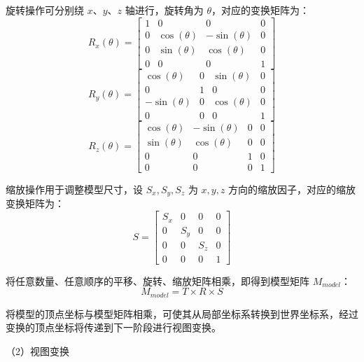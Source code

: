 旋转操作可分别绕 $x$、$y$、$z$ 轴进行，旋转角为 $\theta$，对应的变换矩阵为：
\begin{equation}
R_x(\theta) = 
\begin{bmatrix}
1 & 0 & 0 & 0 \\
0 & \cos(\theta) & -\sin(\theta) & 0 \\
0 & \sin(\theta) & \cos(\theta) & 0 \\
0 & 0 & 0 & 1 
\end{bmatrix}
\tag{2-2}
\end{equation}
\begin{equation}
R_y(\theta) = 
\begin{bmatrix}
\cos(\theta) & 0 & \sin(\theta) & 0 \\
0 & 1 & 0 & 0 \\
-\sin(\theta) & 0 & \cos(\theta) & 0 \\
0 & 0 & 0 & 1 
\end{bmatrix}
\tag{2-3}
\end{equation}
\begin{equation}
R_z(\theta) = 
\begin{bmatrix}
\cos(\theta) & -\sin(\theta) & 0 & 0 \\
\sin(\theta) & \cos(\theta) & 0 & 0 \\
0 & 0 & 1 & 0 \\
0 & 0 & 0 & 1 
\end{bmatrix}
\tag{2-4}
\end{equation}

缩放操作用于调整模型尺寸，设 $S_x, S_y, S_z$ 为 $x, y, z$ 方向的缩放因子，对应的缩放变换矩阵为：
\begin{equation}
S = 
\begin{bmatrix}
S_x & 0 & 0 & 0 \\
0 & S_y & 0 & 0 \\
0 & 0 & S_z & 0 \\
0 & 0 & 0 & 1 
\end{bmatrix}
\tag{2-5}
\end{equation}

将任意数量、任意顺序的平移、旋转、缩放矩阵相乘，即得到模型矩阵 $M_{model}$：
\begin{equation}
M_{model} = T \times R \times S
\tag{2-6}
\end{equation}

将模型的顶点坐标与模型矩阵相乘，可使其从局部坐标系转换到世界坐标系，经过变换的顶点坐标将传递到下一阶段进行视图变换。

（2）视图变换

